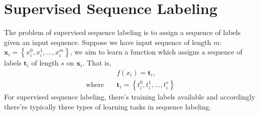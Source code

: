 \documentclass{article}
\newcommand{\vct}[1]{\ensuremath{\boldsymbol{#1}}} %
\begin{document}
\section{Supervised Sequence Labeling}
The problem of supervised sequence labeling \cite{Graves2013} is to assign a sequence of labels given an input sequence. Suppose we have input sequence of length $ m $: $ \vct x_i = \left\lbrace x_i^{0}, x_i^{1}, \ldots, x_i^{m}\right\rbrace $, we aim to learn a function which assigns a sequence of labels $ \vct t_i $ of length $ s $ on $ \vct x_i $. That is, 
\begin{align*}
& f(x_i)  = \vct t_i, \\
\text{where} \quad & \vct t_i = \left\lbrace t_i^{0}, t_i^{1}, \ldots, t_i^{s}\right\rbrace
\end{align*}                 
For supervised sequence labeling, there's training labels available and accordingly there're
typically three types of learning tasks in sequence labeling.
\end{document}
